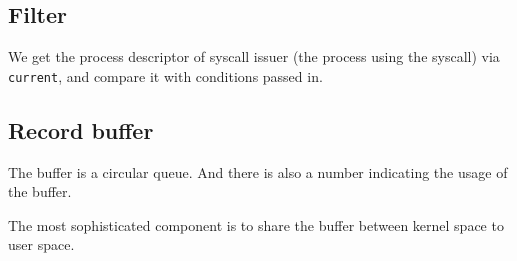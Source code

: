 





\subsection{Filter}

We get the process descriptor of syscall issuer (the process using the syscall) via \texttt{current}, and compare it with conditions passed in.

\subsection{Record buffer}

The buffer is a circular queue. And there is also a number indicating the usage of the buffer. 

The most sophisticated component is to share the buffer between kernel space to user space. 